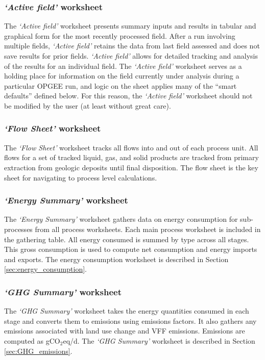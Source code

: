 \documentclass[11pt]{report}
\newcommand{\sheet}[1]{\textit{`{#1}'}}
\begin{document}
\subsubsection{\sheet{Active field} worksheet}

The \sheet{Active field} worksheet presents summary inputs and results in tabular and graphical form for the most recently processed field. After a run involving multiple fields, \sheet{Active field} retains the data from last field assessed and does not save results for prior fields. \sheet{Active field} allows for detailed tracking and analysis of the results for an individual field. 
The \sheet{Active field} worksheet serves as a holding place for information on the field currently under analysis during a particular OPGEE run, and logic on the sheet applies many of the ``smart defaults'' defined below. For this reason, the \sheet{Active field} worksheet should not be modified by the user (at least without great care).

\subsubsection{\sheet{Flow Sheet} worksheet} 

The \sheet{Flow Sheet} worksheet tracks all flows into and out of each process unit. All flows for a set of tracked liquid, gas, and solid products are tracked from primary extraction from geologic deposits until final disposition. The flow sheet is the key sheet for navigating to process level calculations.

\subsubsection{\sheet{Energy Summary} worksheet}

The \sheet{Energy Summary} worksheet gathers data on energy consumption for sub-processes from all process worksheets. Each main process worksheet is included in the gathering table. All energy consumed is summed by type across all stages. This gross consumption is used to compute net consumption and energy imports and exports. The energy consumption worksheet is described in Section \ref{sec:energy_consumption}.

\subsubsection{\sheet{GHG Summary} worksheet} 

The \sheet{GHG Summary} worksheet takes the energy quantities consumed in each stage and converts them to emissions using emissions factors. It also gathers any emissions associated with land use change and VFF emissions. Emissions are computed as gCO$_2$eq/d. The \sheet{GHG Summary} worksheet is described in Section \ref{sec:GHG_emissions}.
\end{document}
